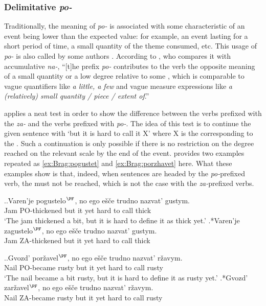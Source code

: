 \subsubsection{Delimitative \textit{po-}}
Traditionally, the  meaning of \textit{po-} is associated with some characteristic of an event being lower than the expected value: for example, an event lasting for a short period of time, a small quantity of the theme consumed, etc. This usage of \textit{po-} is also called  by some authors \citep[e.g.][]{Svenonius:04b}. According to \citet[47--48]{Filip:00}, who compares it with accumulative \textit{na-}, ``[t]he prefix \textit{po-} contributes to the verb the opposite meaning of a small quantity or a low degree relative to some , which is comparable to vague quantifiers like \textit{a little, a few} and vague measure expressions like \textit{a (relatively) small quantity / piece / extent of}.''

\citet[183]{Braginsky:08} applies a neat test in order to show the difference between the verbs prefixed with the  \textit{za-} and the verbs prefixed with \textit{po-}. The idea of this test is to continue the given sentence with `but it is hard to call it X' where X is the  corresponding to the . Such a continuation is only possible if there is no restriction on the degree reached on the relevant scale by the end of the event. \citet[183]{Braginsky:08} provides two examples repeated as \ref{ex:Brag:pogustet} and \ref{ex:Brag:porzhavet} here. What these examples show is that, indeed, when sentences are headed by the \textit{po-}prefixed verb, the  must not be reached, which is not the case with the \textit{za-}prefixed  verbs.

\ex.\label{ex:Brag:pogustet}\ag.Varen'je pogustelo$^{\PF}$, no ego e\v{s}\v{c}e trudno nazvat' gustym.\\
Jam PO-thickened but it yet hard {to call} thick\\
\trans `The jam thickened a bit, but it is hard to define it as thick yet.'
\bg.*Varen'je zagustelo$^{\PF}$, no ego e\v{s}\v{c}e trudno nazvat' gustym.\\
Jam ZA-thickened but it yet hard {to call} thick\\

\ex.\label{ex:Brag:porzhavet}\ag.Gvozd' por\v{z}avel$^{\PF}$, no ego e\v{s}\v{c}e trudno nazvat' r\v{z}avym.\\
Nail {PO-became rusty} but it yet hard {to call} rusty\\
\trans `The nail became a bit rusty, but it is hard to define it as rusty yet.'
\bg.*Gvozd' zar\v{z}avel$^{\PF}$, no ego e\v{s}\v{c}e trudno nazvat' r\v{z}avym.\\
Nail {ZA-became rusty} but it yet hard {to call} rusty\\


